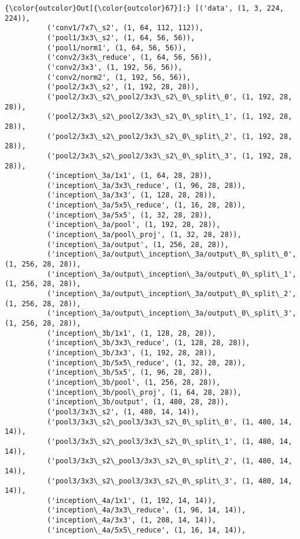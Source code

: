 \documentclass{article}
\begin{document}
            \begin{Verbatim}[commandchars=\\\{\}]
{\color{outcolor}Out[{\color{outcolor}67}]:} [('data', (1, 3, 224, 224)),
          ('conv1/7x7\_s2', (1, 64, 112, 112)),
          ('pool1/3x3\_s2', (1, 64, 56, 56)),
          ('pool1/norm1', (1, 64, 56, 56)),
          ('conv2/3x3\_reduce', (1, 64, 56, 56)),
          ('conv2/3x3', (1, 192, 56, 56)),
          ('conv2/norm2', (1, 192, 56, 56)),
          ('pool2/3x3\_s2', (1, 192, 28, 28)),
          ('pool2/3x3\_s2\_pool2/3x3\_s2\_0\_split\_0', (1, 192, 28, 28)),
          ('pool2/3x3\_s2\_pool2/3x3\_s2\_0\_split\_1', (1, 192, 28, 28)),
          ('pool2/3x3\_s2\_pool2/3x3\_s2\_0\_split\_2', (1, 192, 28, 28)),
          ('pool2/3x3\_s2\_pool2/3x3\_s2\_0\_split\_3', (1, 192, 28, 28)),
          ('inception\_3a/1x1', (1, 64, 28, 28)),
          ('inception\_3a/3x3\_reduce', (1, 96, 28, 28)),
          ('inception\_3a/3x3', (1, 128, 28, 28)),
          ('inception\_3a/5x5\_reduce', (1, 16, 28, 28)),
          ('inception\_3a/5x5', (1, 32, 28, 28)),
          ('inception\_3a/pool', (1, 192, 28, 28)),
          ('inception\_3a/pool\_proj', (1, 32, 28, 28)),
          ('inception\_3a/output', (1, 256, 28, 28)),
          ('inception\_3a/output\_inception\_3a/output\_0\_split\_0', (1, 256, 28, 28)),
          ('inception\_3a/output\_inception\_3a/output\_0\_split\_1', (1, 256, 28, 28)),
          ('inception\_3a/output\_inception\_3a/output\_0\_split\_2', (1, 256, 28, 28)),
          ('inception\_3a/output\_inception\_3a/output\_0\_split\_3', (1, 256, 28, 28)),
          ('inception\_3b/1x1', (1, 128, 28, 28)),
          ('inception\_3b/3x3\_reduce', (1, 128, 28, 28)),
          ('inception\_3b/3x3', (1, 192, 28, 28)),
          ('inception\_3b/5x5\_reduce', (1, 32, 28, 28)),
          ('inception\_3b/5x5', (1, 96, 28, 28)),
          ('inception\_3b/pool', (1, 256, 28, 28)),
          ('inception\_3b/pool\_proj', (1, 64, 28, 28)),
          ('inception\_3b/output', (1, 480, 28, 28)),
          ('pool3/3x3\_s2', (1, 480, 14, 14)),
          ('pool3/3x3\_s2\_pool3/3x3\_s2\_0\_split\_0', (1, 480, 14, 14)),
          ('pool3/3x3\_s2\_pool3/3x3\_s2\_0\_split\_1', (1, 480, 14, 14)),
          ('pool3/3x3\_s2\_pool3/3x3\_s2\_0\_split\_2', (1, 480, 14, 14)),
          ('pool3/3x3\_s2\_pool3/3x3\_s2\_0\_split\_3', (1, 480, 14, 14)),
          ('inception\_4a/1x1', (1, 192, 14, 14)),
          ('inception\_4a/3x3\_reduce', (1, 96, 14, 14)),
          ('inception\_4a/3x3', (1, 208, 14, 14)),
          ('inception\_4a/5x5\_reduce', (1, 16, 14, 14)),

\end{Verbatim}
\end{document}
